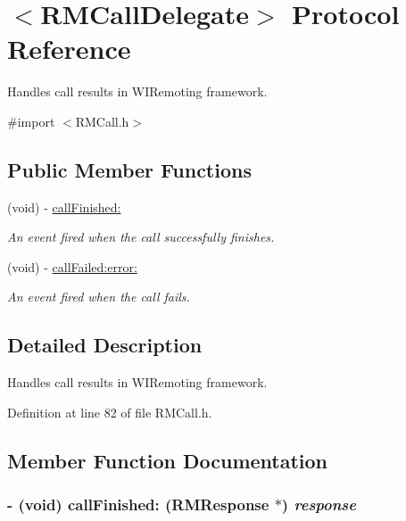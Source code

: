 \hypertarget{protocol_r_m_call_delegate-p}{
\section{$<$RMCallDelegate$>$ Protocol Reference}
\label{protocol_r_m_call_delegate-p}
}


Handles call results in WIRemoting framework.  


{\ttfamily \#import $<$RMCall.h$>$}\subsection*{Public Member Functions}
\begin{DoxyCompactItemize}
\item 
(void) -\/ \hyperlink{protocol_r_m_call_delegate-p_a4e44f6ff8fb2ed3324aeca5b6ed29492}{callFinished:}
\begin{DoxyCompactList}\small\item\em An event fired when the call successfully finishes. \item\end{DoxyCompactList}\item 
(void) -\/ \hyperlink{protocol_r_m_call_delegate-p_a77f0f0f7675f43f3052198c74bfcdbe1}{callFailed:error:}
\begin{DoxyCompactList}\small\item\em An event fired when the call fails. \item\end{DoxyCompactList}\end{DoxyCompactItemize}


\subsection{Detailed Description}
Handles call results in WIRemoting framework. 

Definition at line 82 of file RMCall.h.

\subsection{Member Function Documentation}
\hypertarget{protocol_r_m_call_delegate-p_a4e44f6ff8fb2ed3324aeca5b6ed29492}{
\subsubsection[{callFinished:}]{\setlength{\rightskip}{0pt plus 5cm}-\/ (void) callFinished: ({\bf RMResponse} $\ast$) {\em response}}}
\label{protocol_r_m_call_delegate-p_a4e44f6ff8fb2ed3324aeca5b6ed29492}


